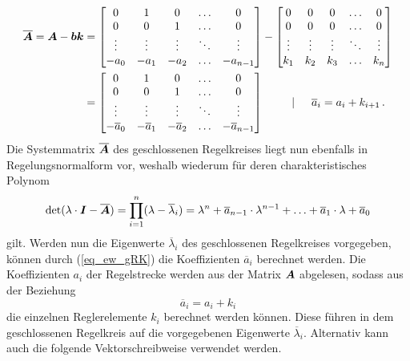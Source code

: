 \begin{equation}
\begin{split}
\boldsymbol{\overline{A}} = \boldsymbol{A}-\boldsymbol{b}\boldsymbol{k} &= \begin{bmatrix}
0 & 1 & 0 & \hdots & 0 \\
0 & 0 & 1 & \hdots & 0 \\
\vdots & \vdots & \vdots & \ddots & \vdots \\
-a_{\text{0}} & -a_{\text{1}} & -a_{\text{2}} & \hdots & -a_{n-1}
\end{bmatrix}
-
\begin{bmatrix}
0 & 0 & 0 & \hdots & 0 \\
0 & 0 & 0 & \hdots & 0 \\
\vdots & \vdots & \vdots &  \ddots & \vdots \\
k_{\text{1}} & k_{\text{2}} & k_{\text{3}} & \hdots & k_n
\end{bmatrix}
\\
&= \begin{bmatrix}
0 & 1 & 0 & \hdots & 0 \\
0 & 0 & 1 & \hdots & 0 \\
\vdots & \vdots & \vdots & \ddots & \vdots \\
-\overline{a}_{\text{0}} & -\overline{a}_{\text{1}} & -\overline{a}_{\text{2}} & \hdots & -\overline{a}_{n-1}
\end{bmatrix}
\hspace{25pt} \vert \hspace{15pt} \overline{a}_i = a_i + k_{i+1} \,.
\end{split}
\end{equation}
Die Systemmatrix $\boldsymbol{\overline{A}}$ des geschlossenen Regelkreises liegt nun ebenfalls in Regelungsnormalform vor, weshalb wiederum für deren charakteristisches Polynom
\begin{equation}
\text{det}(\lambda\cdot \boldsymbol{I}-\boldsymbol{\overline{A}}) = \prod^n_{i=1} (\lambda-\overline{\lambda}_i) = \lambda^n+\overline{a}_{n-1}\cdot \lambda^{n-1} + \hdots + \overline{a}_{\text{1}}\cdot \lambda + \overline{a}_{\text{0}}
\label{eq_ew_gRK}
\end{equation}
gilt. Werden nun die Eigenwerte $\overline{\lambda}_i$ des geschlossenen Regelkreises vorgegeben, können durch (\ref{eq_ew_gRK}) die Koeffizienten $\overline{a}_i$ berechnet werden. Die Koeffizienten $a_i$ der Regelstrecke werden aus der Matrix $\boldsymbol{A}$ abgelesen, sodass aus der Beziehung
\begin{equation}
\overline{a}_i = a_i + k_i
\end{equation}
die einzelnen Reglerelemente $k_i$ berechnet werden können. Diese führen in dem geschlossenen Regelkreis auf die vorgegebenen Eigenwerte $\overline{\lambda}_i$. Alternativ kann auch die folgende Vektorschreibweise verwendet werden.
